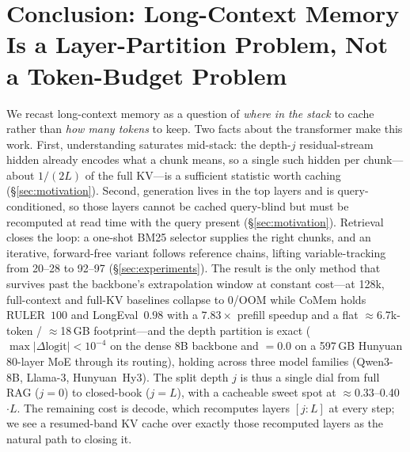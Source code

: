 \section{Conclusion: Long-Context Memory Is a Layer-Partition
Problem, Not a Token-Budget Problem}
\label{sec:conclusion}
We recast long-context memory as a question of \emph{where in the stack} to
cache rather than \emph{how many tokens} to keep. Two facts about the
transformer make this work. First, understanding saturates mid-stack: the
depth-$j$ residual-stream hidden already encodes what a chunk means, so a
single such hidden per chunk---about $1/(2L)$ of the full KV---is a sufficient
statistic worth caching (\S\ref{sec:motivation}). Second, generation lives in
the top layers and is query-conditioned, so those layers cannot be cached
query-blind but must be recomputed at read time with the query present
(\S\ref{sec:motivation}). Retrieval closes the loop: a one-shot BM25 selector
supplies the right chunks, and an iterative, forward-free variant follows
reference chains, lifting variable-tracking from 20--28 to 92--97
(\S\ref{sec:experiments}). The result is the only method that survives past the
backbone's extrapolation window at constant cost---at 128k, full-context and
full-KV baselines collapse to $0$/OOM while CoMem holds RULER~$100$ and
LongEval~$0.98$ with a $7.83\times$ prefill speedup and a flat
$\approx$6.7k-token / $\approx$18\,GB footprint---and the depth partition is
exact ($\max|\Delta\text{logit}|<10^{-4}$ on the dense 8B backbone and
$=0.0$ on a 597\,GB Hunyuan 80-layer MoE through its routing), holding across
three model families (Qwen3-8B, Llama-3, Hunyuan~Hy3). The split depth $j$ is
thus a single dial from full RAG ($j{=}0$) to closed-book ($j{=}L$), with a
cacheable sweet spot at $\approx$0.33--0.40$\cdot L$. The remaining cost is
decode, which recomputes layers $[j{:}L]$ at every step; we see a resumed-band
KV cache over exactly those recomputed layers as the natural path to closing
it.
